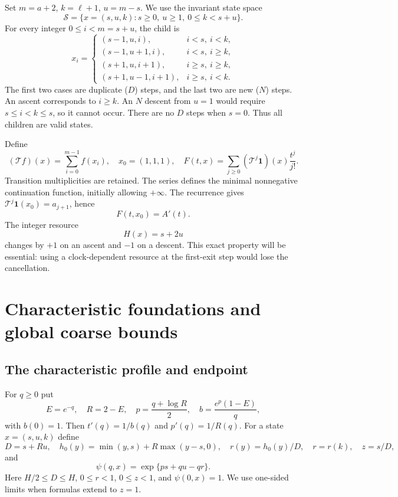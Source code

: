 \documentclass[11pt,letterpaper]{article}
\theoremstyle{remark}
\newcommand{\TT}{\mathcal T}
\newcommand{\one}{\mathbf 1}
\newcommand{\Sstate}{\mathcal S}
\begin{document}
Set $m=a+2$, $k=\ell+1$, $u=m-s$. We use the invariant state space
\[
 \Sstate=\{x=(s,u,k):s\ge0,\ u\ge1,\ 0\le k<s+u\}.
\]
For every integer $0\le i<m=s+u$, the child is
\begin{equation}\label{a58:ln:eq:children}
 x_i=\begin{cases}
 (s-1,u,i),&i<s,\ i<k,\\
 (s-1,u+1,i),&i<s,\ i\ge k,\\
 (s+1,u,i+1),&i\ge s,\ i\ge k,\\
 (s+1,u-1,i+1),&i\ge s,\ i<k.
 \end{cases}
\end{equation}
The first two cases are duplicate ($D$) steps, and the last two are new
($N$) steps. An ascent corresponds to $i\ge k$. An $N$ descent from $u=1$
would require $s\le i<k\le s$, so it cannot occur. There are no $D$ steps
when $s=0$. Thus all children are valid states.

Define
\begin{equation}\label{a58:ln:eq:transfer}
 (\TT f)(x)=\sum_{i=0}^{m-1}f(x_i),\quad x_0=(1,1,1),\quad
 F(t,x)=\sum_{j\ge0}(\TT^j\one)(x)\frac{t^j}{j!}.
\end{equation}
Transition multiplicities are retained. The series defines the minimal
nonnegative continuation function, initially allowing $+\infty$.
The recurrence gives $\TT^j\one(x_0)=a_{j+1}$, hence
\begin{equation}\label{a58:ln:eq:rootidentity}F(t,x_0)=A'(t).
\end{equation}
The integer resource
\begin{equation}\label{a58:ln:eq:H}H(x)=s+2u
\end{equation}
changes by $+1$ on an ascent and $-1$ on a descent. This exact property
will be essential: using a clock-dependent resource at the first-exit
step would lose the cancellation.

\section{Characteristic foundations and global coarse bounds}\label{a58:ln:sec:foundation}
\subsection{The characteristic profile and endpoint}
For $q\ge0$ put
\begin{equation}\label{a58:ln:eq:pars}
 E=e^{-q},\quad R=2-E,\quad p=\frac{q+\log R}{2},\quad
 b=\frac{e^p(1-E)}q,
\end{equation}
with $b(0)=1$. Then $t'(q)=1/b(q)$ and $p'(q)=1/R(q)$.
For a state $x=(s,u,k)$ define
\begin{equation}\label{a58:ln:eq:rank}
 D=s+Ru,\quad h_0(y)=\min(y,s)+R\max(y-s,0),\quad
 r(y)=h_0(y)/D,\quad r=r(k),\quad z=s/D,
\end{equation}
and
\begin{equation}\label{a58:ln:eq:psi}
 \psi(q,x)=\exp\{ps+qu-qr\}.
\end{equation}
Here $H/2\le D\le H$, $0\le r<1$, $0\le z<1$, and
$\psi(0,x)=1$. We use one-sided limits when formulas extend to $z=1$.
\end{document}
